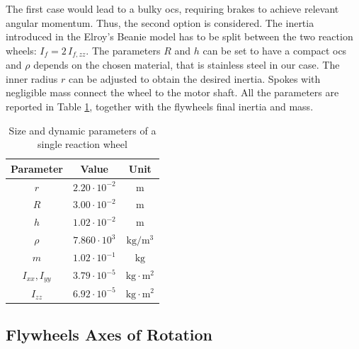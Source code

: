 \documentclass[letterpaper, 10 pt, conference]{ieeeconf}  %
\begin{document}
The first case would lead to a bulky \gls{ocs}, requiring brakes to achieve relevant angular momentum. Thus, the second option is considered. The inertia introduced in the Elroy's Beanie model has to be split between the two reaction wheels: $I_f = 2 \, I_{f, zz}$. 
The parameters $R$ and $h$ can be set to have a compact \gls{ocs} and $\rho$ depends on the chosen material, that is stainless steel in our case. The inner radius $r$ can be adjusted to obtain the desired inertia. Spokes with negligible mass connect the wheel to the motor shaft. All the parameters are reported in Table \ref{tab:dim_fw}, together with the flywheels final inertia and mass.
\begin{table}
	\centering
	\caption{\small Size and dynamic parameters of a single reaction wheel}
	\begin{tabular}{ccc}
		Parameter & Value & Unit \\
		\hline
		\hline
		$r$ & $2.20\cdot 10^{-2}$ & $\mathrm{m}$ \\
		$R$ & $3.00\cdot 10^{-2}$ & $\mathrm{m}$ \\
		$h$   & $1.02\cdot 10^{-2}$ & $\mathrm{m}$ \\
		$\rho$   & $7.860 \cdot 10^{3}$ & $\mathrm{kg/m^3}$ \\
		$m$   & $1.02\cdot 10^{-1}$ & $\mathrm{kg}$ \\
		$I_{xx}, I_{yy}$   & $3.79 \cdot 10^{-5}$ & $\mathrm{kg \cdot m^2}$ \\
		$I_{zz}$   & $6.92 \cdot 10^{-5}$ & $ \mathrm{kg \cdot m^2}$ \\
	\end{tabular}
	\label{tab:dim_fw}
\end{table}

\subsection{Flywheels Axes of Rotation}
\end{document}
